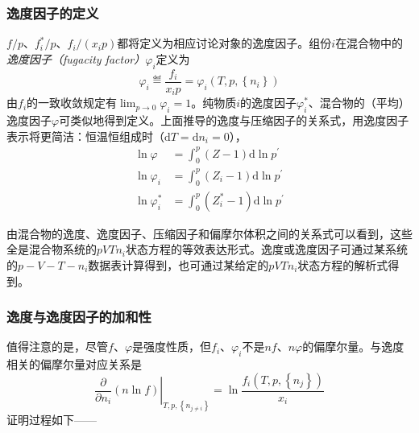 \documentclass[main.tex]{subfiles}
\begin{document}
\subsubsection{逸度因子的定义}
$f/p$、$f_i^*/p$、$f_i/\left(x_ip\right)$都将定义为相应讨论对象的逸度因子。组份$i$在混合物中的\emph{逸度因子（fugacity factor）}$\varphi_i$定义为
\begin{equation}\label{eq:II.4_def_fugacity_factor_i}
  \varphi_i\eqdef\frac{f_i}{x_ip}=\varphi_i\left(T,p,\left\{n_i\right\}\right)
\end{equation}
由$f_i$的一致收敛规定有$\lim_{p\to 0}\varphi_i=1$。纯物质$i$的逸度因子$\varphi_i^*$、混合物的（平均）逸度因子$\varphi$可类似地得到定义。上面推导的逸度与压缩因子的关系式，用逸度因子表示将更简洁：恒温恒组成时（$\mathrm{d}T=\mathrm{d}n_i=0$），
\begin{align*}
  \ln\varphi     & =\int_0^p\left(Z-1\right)\mathrm{d}\ln p^\prime     \\
  \ln\varphi_i   & =\int_0^p\left(Z_i-1\right)\mathrm{d}\ln p^\prime   \\
  \ln\varphi^*_i & =\int_0^p\left(Z_i^*-1\right)\mathrm{d}\ln p^\prime
\end{align*}

由混合物的逸度、逸度因子、压缩因子和偏摩尔体积之间的关系式可以看到，这些全是混合物系统的$pVTn_i$状态方程的等效表达形式。逸度或逸度因子可通过某系统的$p-V-T-n_i$数据表计算得到，也可通过某给定的$pVTn_i$状态方程的解析式得到。

\subsubsection{逸度与逸度因子的加和性}
值得注意的是，尽管$f$、$\varphi$是强度性质，但$f_i$、$\varphi_i$不是$nf$、$n\varphi$的偏摩尔量。与逸度相关的偏摩尔量对应关系是
\[\left.\frac{\partial}{\partial n_i}\left(n\ln f\right)\right|_{T,p,\left\{n_{j\neq i}\right\}}=\ln\frac{f_i\left(T,p,\left\{n_j\right\}\right)}{x_i}\]
证明过程如下——
\end{document}
